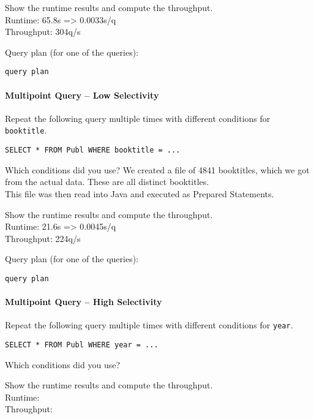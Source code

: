 \documentclass[11pt]{scrartcl}
\begin{document}
\smallskip\noindent
Show the runtime results and compute the throughput.\\
Runtime: 65.8s => 0.0033s/q\\
Throughput: 304q/s

\smallskip\noindent
Query plan (for one of the queries):
{\small
\begin{verbatim}
query plan
\end{verbatim}
}


\paragraph{Multipoint Query -- Low Selectivity}

Repeat the following query multiple times with different conditions for {\tt booktitle}.

{\small
\begin{verbatim}
SELECT * FROM Publ WHERE booktitle = ...
\end{verbatim}
}

\noindent
Which conditions did you use?
We created a file of 4841 booktitles, which we got from the actual data. These are all distinct booktitles.\\
This file was then read into Java and executed as Prepared Statements.

\smallskip\noindent
Show the runtime results and compute the throughput.\\
Runtime: 21.6s => 0.0045s/q\\
Throughput: 224q/s

\smallskip\noindent
Query plan (for one of the queries):
{\small
\begin{verbatim}
query plan
\end{verbatim}
}


\paragraph{Multipoint Query -- High Selectivity}

Repeat the following query multiple times with different conditions for {\tt year}.

{\small
\begin{verbatim}
SELECT * FROM Publ WHERE year = ...
\end{verbatim}
}

\noindent
Which conditions did you use?

\smallskip\noindent
Show the runtime results and compute the throughput.\\
Runtime: \\
Throughput: 
\end{document}

